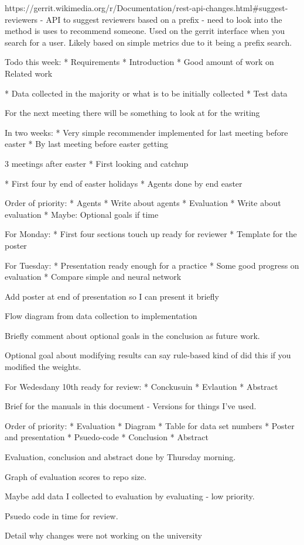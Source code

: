 https://gerrit.wikimedia.org/r/Documentation/rest-api-changes.html#suggest-reviewers - API to suggest reviewers based on a prefix - need to look into the method is uses to recommend someone. Used on the gerrit interface when you search for a user. Likely based on simple metrics due to it being a prefix search.



Todo this week:
* Requirements
* Introduction
* Good amount of work on Related work

* Data collected in the majority or what is to be initially collected
* Test data

For the next meeting there will be something to look at for the writing


In two weeks:
* Very simple recommender implemented for last meeting before easter
* By last meeting before easter getting 

3 meetings after easter
* First looking and catchup

* First four by end of easter holidays
* Agents done by end easter


Order of priority:
* Agents
* Write about agents
* Evaluation
* Write about evaluation
* Maybe: Optional goals if time




For Monday:
* First four sections touch up ready for reviewer
* Template for the poster

For Tuesday:
* Presentation ready enough for a practice
* Some good progress on evaluation
* Compare simple and neural network

Add poster at end of presentation so I can present it briefly

Flow diagram from data collection to implementation

Briefly comment about optional goals in the conclusion as future work.

Optional goal about modifying results can say rule-based kind of did this if you modified the weights.

For Wedesdany 10th ready for review:
* Conckusuin
* Evlaution
* Abstract

Brief for the manuals in this document - Versions for things I've used.




Order of priority:
* Evaluation
* Diagram
* Table for data set numbers
* Poster and presentation
* Psuedo-code
* Conclusion
* Abstract

Evaluation, conclusion and abstract done by Thursday morning.

Graph of evaluation scores to repo size.

Maybe add data I collected to evaluation by evaluating - low priority.

Psuedo code in time for review.

Detail why changes were not working on the university 